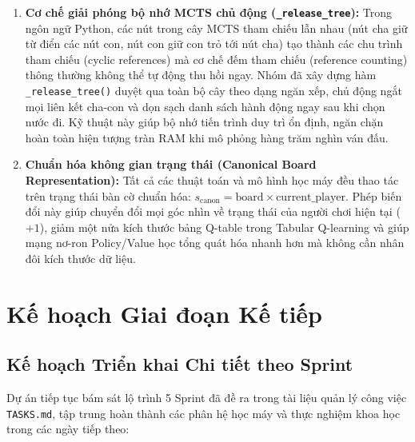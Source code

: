 \documentclass[a4paper,12pt]{report}
\begin{document}
\begin{enumerate}[leftmargin=1.5cm]
    \item \textbf{Cơ chế giải phóng bộ nhớ MCTS chủ động (\texttt{\_release\_\allowbreak tree}):}
    Trong ngôn ngữ Python, các nút trong cây MCTS tham chiếu lẫn nhau (nút cha giữ từ điển các nút con, nút con giữ con trỏ tới nút cha) tạo thành các chu trình tham chiếu (cyclic references) mà cơ chế đếm tham chiếu (reference counting) thông thường không thể tự động thu hồi ngay. Nhóm đã xây dựng hàm \texttt{\_release\_\allowbreak tree()} duyệt qua toàn bộ cây theo dạng ngăn xếp, chủ động ngắt mọi liên kết cha-con và dọn sạch danh sách hành động ngay sau khi chọn nước đi. Kỹ thuật này giúp bộ nhớ tiến trình duy trì ổn định, ngăn chặn hoàn toàn hiện tượng tràn RAM khi mô phỏng hàng trăm nghìn ván đấu.

    \item \textbf{Chuẩn hóa không gian trạng thái (Canonical Board Representation):}
    Tất cả các thuật toán và mô hình học máy đều thao tác trên trạng thái bàn cờ chuẩn hóa: $s_{\text{canon}} = \text{board} \times \text{current\_player}$. Phép biến đổi này giúp chuyển đổi mọi góc nhìn về trạng thái của người chơi hiện tại ($+1$), giảm một nửa kích thước bảng Q-table trong Tabular Q-learning và giúp mạng nơ-ron Policy/Value học tổng quát hóa nhanh hơn mà không cần nhân đôi kích thước dữ liệu.
\end{enumerate}

\clearpage
\section{Kế hoạch Giai đoạn Kế tiếp}

\subsection{Kế hoạch Triển khai Chi tiết theo Sprint}
Dự án tiếp tục bám sát lộ trình 5 Sprint đã đề ra trong tài liệu quản lý công việc \texttt{TASKS.md}, tập trung hoàn thành các phân hệ học máy và thực nghiệm khoa học trong các ngày tiếp theo:
\end{document}
